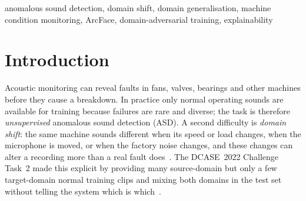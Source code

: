 \documentclass[conference]{IEEEtran}
\providecommand{\OffBestBase}{--}\providecommand{\BestBaseline}{--}\providecommand{\GainOverBest}{--}\providecommand{\GainFullOverBest}{--}
\begin{document}
\begin{abstract}
Machine sounds are a cheap source of condition information, but faults are rare, so detectors must be trained on normal sounds only, and they must keep working when operating speed, load, microphone position or background noise change (domain shift). We study unsupervised anomalous sound detection under domain shift on MIMII~DG and ToyADMOS2 and propose DA-ArcNet, a small convolutional model that combines (i)~a learnable adaptive clip-mean normalisation layer, (ii)~an angular-margin (ArcFace) classifier over machine section and operating condition, (iii)~a gradient-reversal domain adversary intended to make the embedding uninformative about the source/target domain, and (iv)~k-nearest-neighbour scoring against normal reference embeddings, optionally fused with an autoencoder score. We compare it with three re-implemented baselines (DCASE~2022 autoencoder, DCASE~2022 MobileNetV2, ArcFace-kNN) under the DCASE~2022 protocol (AUC, partial AUC), and add an ablation, cross-dataset transfer in both directions, additive-noise robustness, bootstrap confidence intervals, repeated runs, Wilcoxon tests, Grad-CAM and residual-map explanations, and model-size measurements. Over \NMachines{} machines DA-ArcNet obtains an official score of \OffProp{} (target-domain AUC \TgtProp), and the strongest baseline (\BestBaseline) obtains \OffBestBase; the confidence intervals and tests are reported in Section~\ref{sec:results}.
\end{abstract}

\begin{IEEEkeywords}
anomalous sound detection, domain shift, domain generalisation, machine condition monitoring, ArcFace, domain-adversarial training, explainability
\end{IEEEkeywords}

\section{Introduction}
Acoustic monitoring can reveal faults in fans, valves, bearings and other machines before they cause a breakdown. In practice only normal operating sounds are available for training because failures are rare and diverse; the task is therefore \emph{unsupervised} anomalous sound detection (ASD). A second difficulty is \emph{domain shift}: the same machine sounds different when its speed or load changes, when the microphone is moved, or when the factory noise changes, and these changes can alter a recording more than a real fault does~\cite{wilkinghoff2025review}. The DCASE~2022 Challenge Task~2 made this explicit by providing many source-domain but only a few target-domain normal training clips and mixing both domains in the test set without telling the system which is which~\cite{dohi2022dcase}.
\end{document}
